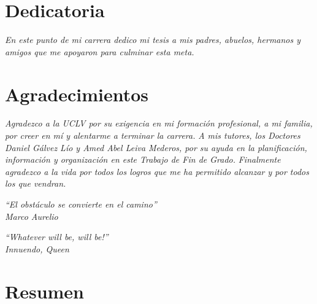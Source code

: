 \documentclass[12pt]{article}
\begin{document}
\newpage
\vspace*{3cm}
\section*{Dedicatoria}
\vspace*{1cm}
\begin{flushright}
    \textit{ En este punto de mi carrera dedico mi tesis a mis padres, abuelos, hermanos y amigos que me apoyaron para culminar esta meta. }    
\end{flushright}









\newpage
\vspace*{3cm}
\section*{Agradecimientos}
\vspace*{1cm}
\begin{flushright}
    \textit{
        Agradezco a la UCLV por su exigencia en mi formación profesional, a mi familia, por creer en mí y alentarme a terminar la carrera.   
    }
    \textit{    
        A mis tutores, los Doctores Daniel Gálvez L\'io  y Amed Abel Leiva Mederos, por su ayuda en la planificación, información y organización en este Trabajo de Fin de Grado.
    }
    \textit{
        Finalmente agradezco a la vida por todos los logros que me ha permitido alcanzar y por todos los que vendran.   
    }
\end{flushright}



\newpage


\begin{flushright}
    \vspace*{7cm}
    \textit{``El obstáculo se convierte en el camino'' \\ Marco Aurelio}
\end{flushright}

\begin{flushright}
    \vspace*{7cm}
    \textit{``Whatever will be, will be!'' \\ Innuendo, Queen}
\end{flushright}

\newpage
\vspace*{3cm}
\section*{Resumen}
\vspace*{1cm}
\end{document}
